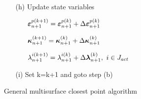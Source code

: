 \documentclass[a4paper]{article}
\newcommand{\mbf}[1]{\mbox{\boldmath$#1$}}
\newcommand{\e}{\mbf{\varepsilon}}
\newcommand{\kap}{\mbf{\kappa}}
\begin{document}
\begin{table}
{\begin{enumerate}
\begin{enumerate}
\begin{itemize}
 \end{itemize}
  \item[(h)]
 Update state variables
 \begin{itemize}
 \item[]
$\e^{p(k+1)}_{n+1}=\e^{p(k)}_{n+1}+\Delta\e^{p(k)}_{n+1}$
 \item[]
$\kap^{(k+1)}_{n+1}=\kap^{(k)}_{n+1}+\Delta\kap^{(k)}_{n+1}$
 \item[]
$\lambda^{i(k+1)}_{n+1}=\lambda^{i(k)}_{n+1}+\Delta\mbf{\lambda}^{(k)}_{n+1},\ i\in J_{act}$
 \end{itemize}
  \item[(i)]
 Set k=k+1 and goto step (b)
  \end{enumerate}
\end{enumerate}
}
\caption{General multisurface closest point algorithm}
\end{table}
\end{document}
